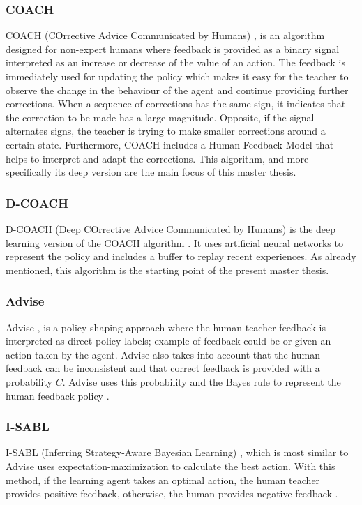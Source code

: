 
 \subsubsection*{COACH}
COACH (COrrective Advice Communicated by Humans) \cite{COACH-Celemin-Ruiz-del-Solar:2015}, is an algorithm designed for non-expert humans where feedback is provided as a binary signal interpreted as an increase or decrease of the value of an action.  The feedback is immediately used for updating the policy which makes it easy for the teacher to observe the change in the behaviour of the agent and continue providing further corrections. When a sequence of corrections has the same sign, it indicates that the correction to be made has a large magnitude. Opposite, if the signal alternates signs, the teacher is trying to make smaller corrections around a certain state. Furthermore, COACH includes a Human Feedback Model that helps to interpret and adapt the corrections.
This algorithm, and more specifically its deep version \cite{D-COACH-Dattari-Celemin-Ruiz-del-Solar-Kober:2018} are the main focus of this master thesis.

\subsubsection*{D-COACH}
D-COACH (Deep COrrective Advice Communicated by Humans) \cite{D-COACH-Dattari-Celemin-Ruiz-del-Solar-Kober:2018} is the deep learning version of the COACH algorithm \cite{COACH-Celemin-Ruiz-del-Solar:2015}. It uses artificial neural networks to represent the policy and includes a buffer to replay recent experiences. As already mentioned, this algorithm is the starting point of the present master thesis.



\subsubsection*{Advise}
Advise \cite{Advise-Griffith-et-al:2013}, is a policy shaping approach where the human teacher feedback is interpreted as direct policy labels; example of feedback could be  or  given an action taken by the agent. Advise also takes into account that the human feedback can be inconsistent and that correct feedback is provided with a probability $C$. Advise uses this probability and the Bayes rule to represent the human feedback policy \cite{leveraging-human-guidance:2019}.

\subsubsection*{I-SABL}
I-SABL (Inferring Strategy-Aware Bayesian Learning) \cite{I-SABL-Loftin:2016}, which is most similar to Advise \cite{Advise-Griffith-et-al:2013} uses expectation-maximization to calculate the best action. With this method, if the learning agent takes an optimal action, the human teacher provides positive feedback, otherwise, the human provides negative feedback \cite{leveraging-human-guidance:2019}.


